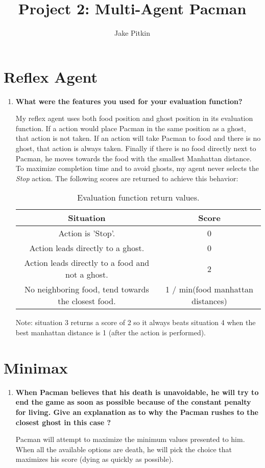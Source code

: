 \documentclass[fleqn]{hw}
\title{Project 2: Multi-Agent Pacman}
\institute{University of Utah}
\author{Jake Pitkin}
\begin{document}
\maketitle
\section{Reflex Agent}
\begin{enumerate}
	\item \textbf{What were the features you used for your evaluation function?}
	
	My reflex agent uses both food position and ghost position in its evaluation function. If a action would place Pacman in the same position as a ghost, that action is not taken. If an action will take Pacman to food and there is no ghost, that action is always taken. Finally if there is no food directly next to Pacman, he moves towards the food with the smallest Manhattan distance. To maximize completion time and to avoid ghosts, my agent never selects the \textit{Stop} action. The following scores are returned to achieve this behavior:
	
	\begin{table}[H]
	\centering
	{\renewcommand{\arraystretch}{1.2}%
	\begin{tabular}{| c | c |}
	\hline
	\textbf{Situation} & \textbf{Score}\\
	\hline
	Action is 'Stop'. & 0\\ \hline
	Action leads directly to a ghost. & 0\\ \hline
	Action leads directly to a food and not a ghost. & 2\\ \hline
	No neighboring food, tend towards the closest food. & 1 / min(food manhattan distances)\\ \hline 
	\end{tabular}}
	\caption{Evaluation function return values.}
	\end{table}
	
	Note: situation 3 returns a score of 2 so it always beats situation 4 when the best manhattan distance is 1 (after the action is performed).
	
\end{enumerate}

\section{Minimax}
\begin{enumerate}
	\item \textbf{When Pacman believes that his death is unavoidable, he will try to end the game as
soon as possible because of the constant penalty for living. Give an explanation as to why
the Pacman rushes to the closest ghost in this case ?}

Pacman will attempt to maximize the minimum values presented to him. When all the available options are death, he will pick the choice that maximizes his score (dying as quickly as possible).
\end{enumerate}
\end{document}
